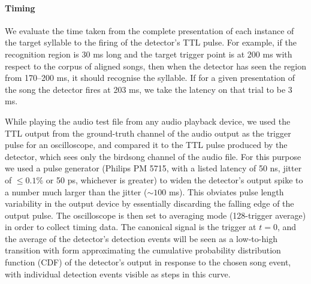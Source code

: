 \documentclass[10pt,letterpaper]{article}
\renewcommand{\subsubsection}[1]{\paragraph{#1}}
\newcommand\argmin{\mathop{\textrm{{\rm argmin}}}\limits}
\newcommand{\noprint}[1]{}
\begin{document}
\noprint{ Since the network will output values $o_t$ between 0 and 1
  at each moment $t$ in an attempt to match the training output, the
  optimal threshold $\tau\in[0,1]$ for the output neuron should be
  computed.  Given the relative cost of false positives vs.~false
  negatives $C$, and the acceptable time difference between target
  syllable and correct output $\Delta t_d$, we compute the optimal
  threshold for an output element according to the definitions above:
\begin{eqnarray*}
  \textrm{true positives}_\tau &=& \textrm{size of set}_{s\in \textrm{target songs}} o_t > \tau, \left| t \leq \Delta t_d \right| \\
  \textrm{false negatives}_\tau &=& \textrm{size of set} {s\in\textrm{target songs}} - \textrm{size of set} \textrm{true positives} \\
  \textrm{false positives}_\tau &=& \textrm{size of set}_{s\in \textrm{target songs}} o_t > \tau, \left| t > \Delta t_d \right| \\
  \widehat{\tau} &=& \argmin_\tau C\textrm{false positive} + \textrm{false negatives}
\end{eqnarray*}
}

\subsubsection{Timing}


We evaluate the time taken from the complete presentation of each
instance of the target syllable to the firing of the detector's TTL
pulse.  For example, if the recognition region is 30 ms long and the
target trigger point is at 200 ms with respect to the corpus of
aligned songs, then when the detector has seen the region from
170--200 ms, it should recognise the syllable.  If for a given
presentation of the song the detector fires at 203 ms, we take the
latency on that trial to be 3 ms.

While playing the audio test file from any audio playback device, we
used the TTL output from the ground-truth channel of the audio output
as the trigger pulse for an oscilloscope, and compared it to the TTL
pulse produced by the detector, which sees only the birdsong channel
of the audio file. For this purpose we used a pulse generator (Philips
PM 5715, with a listed latency of 50 ns, jitter of $\leq 0.1\%$ or 50
ps, whichever is greater) to widen the detector's output spike to a
number much larger than the jitter ($\sim 100$ ms).  This obviates
pulse length variability in the output device by essentially
discarding the falling edge of the output pulse.  The oscilloscope is
then set to averaging mode (128-trigger average) in order to collect
timing data. The canonical signal is the trigger at $t=0$, and the
average of the detector's detection events will be seen as a
low-to-high transition with form approximating the cumulative
probability distribution function (CDF) of the detector's output in
response to the chosen song event, with individual detection events
visible as steps in this curve.
\end{document}
